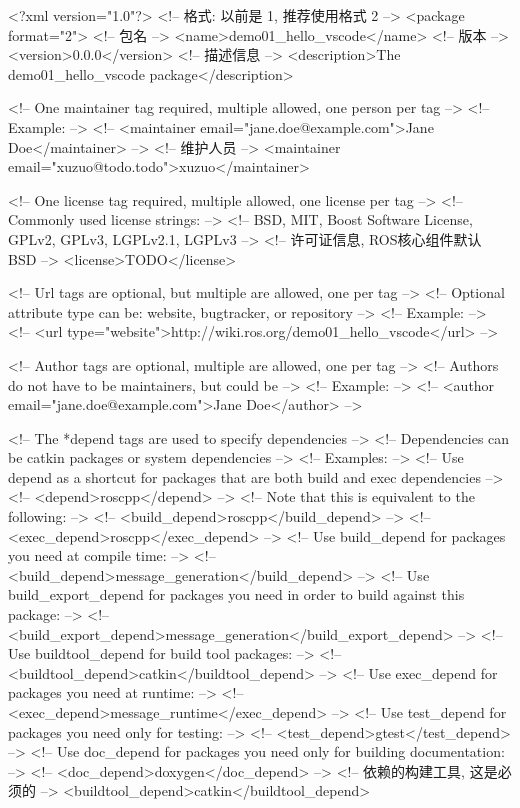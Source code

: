\documentclass[openany, fontset=windowsold]{ctexbook}
\theoremstyle{kaiti}
\theoremstyle{normal}
\begin{document}
\begin{xml}
  <?xml version="1.0"?>
  <!-- 格式: 以前是 1, 推荐使用格式 2 -->
  <package format="2">
    <!-- 包名 -->
    <name>demo01_hello_vscode</name>
    <!-- 版本 -->
    <version>0.0.0</version>
    <!-- 描述信息 -->
    <description>The demo01_hello_vscode package</description>

    <!-- One maintainer tag required, multiple allowed, one person per tag -->
    <!-- Example:  -->
    <!-- <maintainer email="jane.doe@example.com">Jane Doe</maintainer> -->
    <!-- 维护人员 -->
    <maintainer email="xuzuo@todo.todo">xuzuo</maintainer>

    <!-- One license tag required, multiple allowed, one license per tag -->
    <!-- Commonly used license strings: -->
    <!--   BSD, MIT, Boost Software License, GPLv2, GPLv3, LGPLv2.1, LGPLv3 -->
    <!-- 许可证信息, ROS核心组件默认 BSD -->
    <license>TODO</license>

    <!-- Url tags are optional, but multiple are allowed, one per tag -->
    <!-- Optional attribute type can be: website, bugtracker, or repository -->
    <!-- Example: -->
    <!-- <url type="website">http://wiki.ros.org/demo01_hello_vscode</url> -->

    <!-- Author tags are optional, multiple are allowed, one per tag -->
    <!-- Authors do not have to be maintainers, but could be -->
    <!-- Example: -->
    <!-- <author email="jane.doe@example.com">Jane Doe</author> -->

    <!-- The *depend tags are used to specify dependencies -->
    <!-- Dependencies can be catkin packages or system dependencies -->
    <!-- Examples: -->
    <!-- Use depend as a shortcut for packages that are both build and exec dependencies -->
    <!--   <depend>roscpp</depend> -->
    <!--   Note that this is equivalent to the following: -->
    <!--   <build_depend>roscpp</build_depend> -->
    <!--   <exec_depend>roscpp</exec_depend> -->
    <!-- Use build_depend for packages you need at compile time: -->
    <!--   <build_depend>message_generation</build_depend> -->
    <!-- Use build_export_depend for packages you need in order to build against this package: -->
    <!--   <build_export_depend>message_generation</build_export_depend> -->
    <!-- Use buildtool_depend for build tool packages: -->
    <!--   <buildtool_depend>catkin</buildtool_depend> -->
    <!-- Use exec_depend for packages you need at runtime: -->
    <!--   <exec_depend>message_runtime</exec_depend> -->
    <!-- Use test_depend for packages you need only for testing: -->
    <!--   <test_depend>gtest</test_depend> -->
    <!-- Use doc_depend for packages you need only for building documentation: -->
    <!--   <doc_depend>doxygen</doc_depend> -->
    <!-- 依赖的构建工具, 这是必须的 -->
    <buildtool_depend>catkin</buildtool_depend>


\end{xml}
\end{document}
